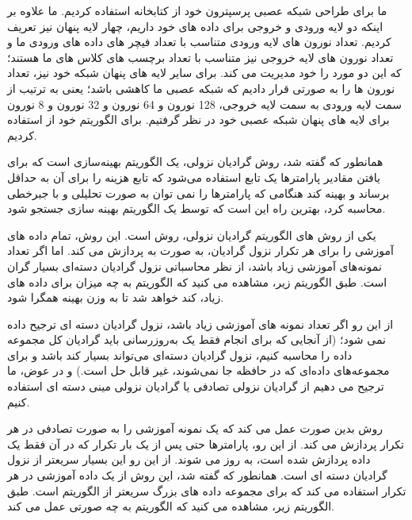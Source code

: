 \documentclass[12pt,onecolumn,a4paper]{article}
\begin{document}
ما برای طراحی شبکه عصبی پرسپترون خود از  کتابخانه  استفاده کردیم. ما علاوه بر اینکه دو لایه ورودی و خروجی برای داده های خود داریم، چهار لایه پنهان نیز تعریف کردیم.
تعداد نورون های لایه ورودی متناسب با تعداد فیچر های داده های ورودی ما و تعداد نورون های لایه خروجی نیز متناسب با تعداد برچسب های کلاس های ما هستند؛ که این دو مورد را خود   مدیریت می کند. برای سایر لایه های پنهان شبکه خود نیز، تعداد نورون ها را به صورتی قرار دادیم که شبکه عصبی ما کاهشی باشد؛ یعنی به ترتیب از سمت لایه ورودی به سمت لایه خروجی، 128 نورون و 64 نورون و 32 نورون و 8 نورون برای لایه های پنهان شبکه عصبی خود در نظر گرفتیم. برای الگوریتم خود از  استفاده کردیم.

همانطور که گفته شد، روش گرادیان نزولی، یک الگوریتم بهینه‌سازی است که برای یافتن مقادیر پارامترها یک تابع استفاده می‌شود که تابع هزینه را برای آن به حداقل برساند و بهینه کند هنگامی که پارامترها را نمی توان به صورت تحلیلی و با جبرخطی محاسبه کرد، بهترین راه این است که توسط یک الگوریتم بهینه سازی جستجو شود.

یکی از روش های الگوریتم گرادیان نزولی، روش  است. این روش، تمام داده های آموزشی را برای هر تکرار نزول گرادیان، به صورت  به  پردازش می کند. اما اگر تعداد نمونه‌های آموزشی زیاد باشد، از نظر محاسباتی نزول گرادیان دسته‌ای بسیار گران است. طبق الگوریتم زیر، مشاهده می کنید که الگوریتم  به چه میزان برای داده های زیاد، کند خواهد شد تا به وزن بهینه همگرا شود.


از این رو اگر تعداد نمونه های آموزشی زیاد باشد، نزول گرادیان دسته ای ترجیح داده نمی شود؛ (از آنجایی که برای انجام فقط یک به‌روزرسانی باید گرادیان کل مجموعه داده را محاسبه کنیم، نزول گرادیان دسته‌ای می‌تواند بسیار کند باشد و برای مجموعه‌های داده‌ای که در حافظه جا نمی‌شوند، غیر قابل حل است.) و در عوض، ما ترجیح می دهیم از گرادیان نزولی تصادفی یا گرادیان نزولی مینی دسته ای استفاده کنیم.

روش  بدین صورت عمل می کند که یک نمونه آموزشی را به صورت تصادفی در هر تکرار پردازش می کند. از این رو، پارامترها حتی پس از یک بار تکرار که در آن فقط یک داده پردازش شده است، به روز می شوند. از این رو این بسیار سریعتر از نزول گرادیان دسته ای است. همانطور که گفته شد، این روش از یک داده آموزشی در هر تکرار استفاده می کند که برای مجموعه داده های بزرگ سریعتر از الگوریتم  است. طبق الگوریتم زیر، مشاهده می کنید که الگوریتم  به چه صورتی عمل می کند.
\end{document}
